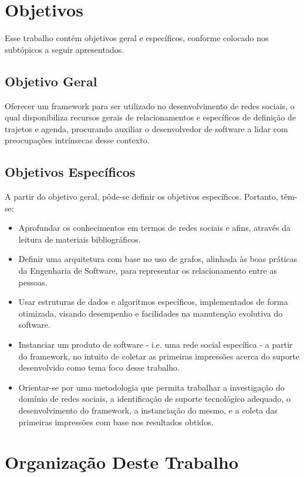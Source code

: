 \section{Objetivos}

Esse trabalho contém objetivos geral e específicos, conforme colocado nos subtópicos a seguir apresentados.

\subsection{Objetivo Geral}

Oferecer um framework para ser utilizado no desenvolvimento de redes sociais, o qual disponibiliza recursos gerais de relacionamentos e específicos de definição de trajetos e agenda, procurando auxiliar o desenvolvedor de software a lidar com preocupações intrínsecas desse contexto.

\subsection{Objetivos Específicos}

A partir do objetivo geral, pôde-se definir os objetivos específicos. Portanto, têm-se:

\begin{itemize}
	\item Aprofundar os conhecimentos em termos de redes sociais e afins, através da leitura de materiais bibliográficos.
	\item Definir uma arquitetura com base no uso de grafos, alinhada às boas práticas da Engenharia de Software, para representar os relacionamento entre as pessoas.
	\item Usar estruturas de dados e algoritmos específicos, implementados de forma otimizada, visando desempenho e facilidades na manutenção evolutiva do software.
	\item Instanciar um produto de software - i.e. uma rede social específica - a partir do framework, no intuito de coletar as primeiras impressões acerca do suporte desenvolvido como tema foco desse trabalho.
	\item Orientar-se por uma metodologia que permita trabalhar a investigação do domínio de redes sociais, a identificação de suporte tecnológico adequado, o desenvolvimento do framework, a instanciação do mesmo, e a coleta das primeiras impressões com base nos resultados obtidos.
\end{itemize}

\section{Organização Deste Trabalho}

